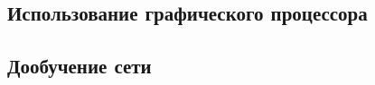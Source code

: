 \documentclass[a4paper,14pt]{extarticle} %
\begin{document}
\subsection{Использование графического процессора}
\hspace{\parindent}

\subsection{Дообучение сети}
\hspace{\parindent}

\newpage
\begin{flushleft}
\end{flushleft}
\end{document}

